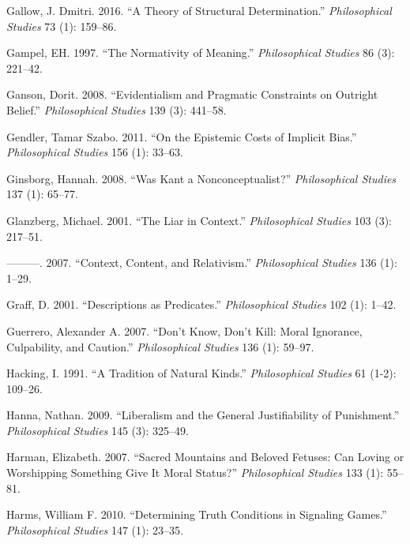 \documentclass[
  10pt,
  letterpaper,
  DIV=11,
  numbers=noendperiod,
  twoside]{scrartcl}
\newlength{\cslhangindent}
\newenvironment{CSLReferences}[2] %
 {\begin{list}{}{%
  \setlength{\itemindent}{0pt}
  \setlength{\leftmargin}{0pt}
  \setlength{\parsep}{0pt}
  \ifodd #1
   \setlength{\leftmargin}{\cslhangindent}
   \setlength{\itemindent}{-1\cslhangindent}
  \fi
  \setlength{\itemsep}{#2\baselineskip}}}
 {\end{list}}
\begin{document}
\begin{CSLReferences}{1}{0}
Gallow, J. Dmitri. 2016. {``A Theory of Structural Determination.''}
\emph{Philosophical Studies} 73 (1): 159--86.

Gampel, EH. 1997. {``The Normativity of Meaning.''} \emph{Philosophical
Studies} 86 (3): 221--42.

Ganson, Dorit. 2008. {``Evidentialism and Pragmatic Constraints on
Outright Belief.''} \emph{Philosophical Studies} 139 (3): 441--58.

Gendler, Tamar Szabo. 2011. {``On the Epistemic Costs of Implicit
Bias.''} \emph{Philosophical Studies} 156 (1): 33--63.

Ginsborg, Hannah. 2008. {``Was Kant a Nonconceptualist?''}
\emph{Philosophical Studies} 137 (1): 65--77.

Glanzberg, Michael. 2001. {``The Liar in Context.''} \emph{Philosophical
Studies} 103 (3): 217--51.

---------. 2007. {``Context, Content, and Relativism.''}
\emph{Philosophical Studies} 136 (1): 1--29.

Graff, D. 2001. {``Descriptions as Predicates.''} \emph{Philosophical
Studies} 102 (1): 1--42.

Guerrero, Alexander A. 2007. {``Don't Know, Don't Kill: Moral Ignorance,
Culpability, and Caution.''} \emph{Philosophical Studies} 136 (1):
59--97.

Hacking, I. 1991. {``A Tradition of Natural Kinds.''}
\emph{Philosophical Studies} 61 (1-2): 109--26.

Hanna, Nathan. 2009. {``Liberalism and the General Justifiability of
Punishment.''} \emph{Philosophical Studies} 145 (3): 325--49.

Harman, Elizabeth. 2007. {``Sacred Mountains and Beloved Fetuses: Can
Loving or Worshipping Something Give It Moral Status?''}
\emph{Philosophical Studies} 133 (1): 55--81.

Harms, William F. 2010. {``Determining Truth Conditions in Signaling
Games.''} \emph{Philosophical Studies} 147 (1): 23--35.


\end{CSLReferences}
\end{document}
